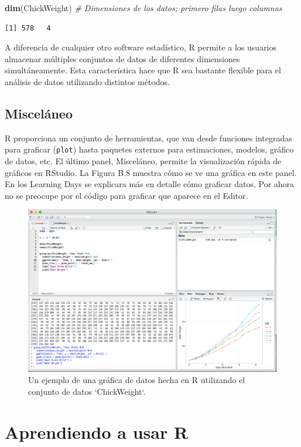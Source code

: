\documentclass[12pt,spanish,]{book}
\newenvironment{Shaded}{\begin{snugshade}}{\end{snugshade}}
\newcommand{\CommentTok}[1]{\textcolor[rgb]{0.56,0.35,0.01}{\textit{#1}}}
\newcommand{\KeywordTok}[1]{\textcolor[rgb]{0.13,0.29,0.53}{\textbf{#1}}}
\newcommand{\NormalTok}[1]{#1}
\begin{document}
\begin{Shaded}
\begin{Highlighting}[]
\KeywordTok{dim}\NormalTok{(ChickWeight) }\CommentTok{# Dimensiones de los datos; primero filas luego columnas}
\end{Highlighting}
\end{Shaded}

\begin{verbatim}
[1] 578   4
\end{verbatim}

A diferencia de cualquier otro software estadístico, R permite a los usuarios almacenar múltiples conjuntos de datos de diferentes dimensiones simultáneamente. Esta característica hace que R sea bastante flexible para el análisis de datos utilizando distintos métodos.

\hypertarget{misceluxe1neo}{%
\subsection{Misceláneo}\label{misceluxe1neo}}

R proporciona un conjunto de herramientas, que van desde funciones integradas para graficar (\texttt{plot}) hasta paquetes externos para estimaciones, modelos, gráfico de datos, etc. El último panel, Misceláneo, permite la visualización rápida de gráficos en RStudio. La Figura B.8 muestra cómo se ve una gráfica en este panel. En los Learning Days se explicara más en detalle cómo graficar datos. Por ahora no se preocupe por el código para graficar que aparece en el Editor.

\begin{figure}
\includegraphics[width=0.6\linewidth]{Images/graph} \caption{Un ejemplo de una gráfica de datos hecha en R utilizando el conjunto de datos `ChickWeight`.}\label{fig:graph}
\end{figure}

\hypertarget{aprendiendo-a-usar-r}{%
\section{Aprendiendo a usar R}\label{aprendiendo-a-usar-r}}
\end{document}
